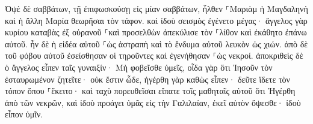 \documentclass{openreader}
\begin{document}
Ὀψὲ δὲ σαββάτων, τῇ ἐπιφωσκούσῃ εἰς μίαν σαββάτων, ἦλθεν ⸀Μαριὰμ ἡ Μαγδαληνὴ καὶ ἡ ἄλλη Μαρία θεωρῆσαι τὸν τάφον. 
καὶ ἰδοὺ σεισμὸς ἐγένετο μέγας· ἄγγελος γὰρ κυρίου καταβὰς ἐξ οὐρανοῦ ⸀καὶ προσελθὼν ἀπεκύλισε τὸν ⸀λίθον καὶ ἐκάθητο ἐπάνω αὐτοῦ. 
ἦν δὲ ἡ εἰδέα αὐτοῦ ⸀ὡς ἀστραπὴ καὶ τὸ ἔνδυμα αὐτοῦ λευκὸν ὡς χιών. 
ἀπὸ δὲ τοῦ φόβου αὐτοῦ ἐσείσθησαν οἱ τηροῦντες καὶ ἐγενήθησαν ⸀ὡς νεκροί. 
ἀποκριθεὶς δὲ ὁ ἄγγελος εἶπεν ταῖς γυναιξίν· Μὴ φοβεῖσθε ὑμεῖς, οἶδα γὰρ ὅτι Ἰησοῦν τὸν ἐσταυρωμένον ζητεῖτε· 
οὐκ ἔστιν ὧδε, ἠγέρθη γὰρ καθὼς εἶπεν· δεῦτε ἴδετε τὸν τόπον ὅπου ⸀ἔκειτο· 
καὶ ταχὺ πορευθεῖσαι εἴπατε τοῖς μαθηταῖς αὐτοῦ ὅτι Ἠγέρθη ἀπὸ τῶν νεκρῶν, καὶ ἰδοὺ προάγει ὑμᾶς εἰς τὴν Γαλιλαίαν, ἐκεῖ αὐτὸν ὄψεσθε· ἰδοὺ εἶπον ὑμῖν. 
\end{document}
